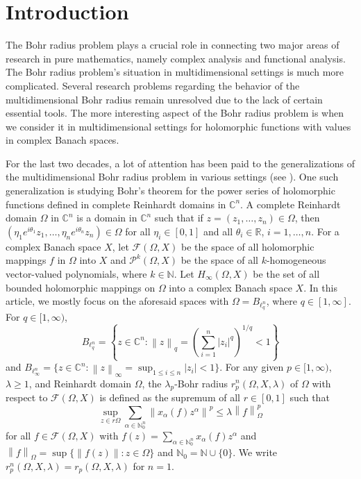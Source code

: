 \documentclass[a4paper,12pt]{amsart}
\theoremstyle{definition}
\newcommand{\norm}[1]{\left\lVert#1\right\rVert}
\begin{document}
\section{Introduction}\label{section-1}
The Bohr radius problem plays a crucial role in connecting two major areas of research in pure mathematics, namely complex analysis and functional analysis. The Bohr radius problem's situation in multidimensional settings is much more complicated. Several research problems regarding the behavior of the multidimensional Bohr radius remain unresolved due to the lack of certain essential tools. The more interesting aspect of the Bohr radius problem is when we consider it in multidimensional settings for holomorphic functions with values in complex Banach spaces.

\vspace{2mm}

For the last two decades, a lot of attention has been paid to the generalizations of the multidimensional Bohr radius problem in various settings (see \cite{aizn-2000a,aizn-2005,boas-1997,defant-2003,defant-2007,popescu-2019}). One such generalization is studying Bohr's theorem for the power series of holomorphic functions defined in complete Reinhardt domains in $\mathbb{C}^n$. A complete Reinhardt domain $\Omega$ in $\mathbb{C}^n$ is a domain in $\mathbb{C}^n$ such that if $z=(z_{1},\ldots,z_{n}) \in \Omega$, then $(\eta_{1} e^{i\theta_{1}}z_{1},\ldots,\eta_{n} e^{i\theta_{n}}z_{n}) \in \Omega$ for all $\eta_{i} \in [0,1]$ and all $\theta_{i} \in \mathbb{R}$, $i=1, \ldots,n$. For a complex Banach space $X$, let $\mathcal{F}(\Omega , X)$ be the space of all holomorphic mappings $f$ in $\Omega$ into $X$ and $\mathcal{P}^k(\Omega,X)$ be the space of all $k$-homogeneous vector-valued polynomials, where $k \in \mathbb{N}$. Let $H_{\infty}(\Omega,X)$ be the set of all bounded holomorphic mappings on $\Omega$ into a complex Banach space $X$. In this article, we mostly focus on the aforesaid spaces with $\Omega=B_{\ell^n _q}$, where $q \in [1,\infty]$. For $q \in [1,\infty)$, 
$$B_{\ell^n _q}= \left\{z \in \mathbb{C}^n:\norm{z}_{q}=\left(\sum_{i=1}^{n}|z_{i}|^q\right)^{1/q}<1\right\}$$
 and $B_{\ell^n _\infty}= \{z \in \mathbb{C}^n: \norm{z}_{\infty}=\sup _{1\leq i \leq n} |z_{i}|<1\}$. For any given $p\in [1,\infty)$, $\lambda \geq 1$, and Reinhardt domain $\Omega$, the $\lambda_{p}$-Bohr radius $r^n_p(\Omega,X,\lambda)$ of $\Omega$ with respect to $\mathcal{F}(\Omega, X)$ is defined as the supremum of all $r \in [0,1]$ such that
 \begin{equation*} 
 	\sup_{z\in r\Omega}\sum_{\alpha\in \mathbb{N}^n_{0}} \norm{x_{\alpha}(f) z^{\alpha}}^p \leq \lambda \norm{f}^p _{\Omega}
  \end{equation*} 
 for all $f \in \mathcal{F}(\Omega, X)$ with $f(z)=\sum_{\alpha\in \mathbb{N}^n_{0}} x_{\alpha}(f) z^{\alpha}$ and $\norm{f}_{\Omega}=\sup \{\|f(z)\|: z \in \Omega\}$ and $\mathbb{N}_0=\mathbb{N}\cup\{0\}$. We write $r^n_p(\Omega,X,\lambda)=r_p(\Omega,X,\lambda)$ for $n=1$. \\
\end{document}
